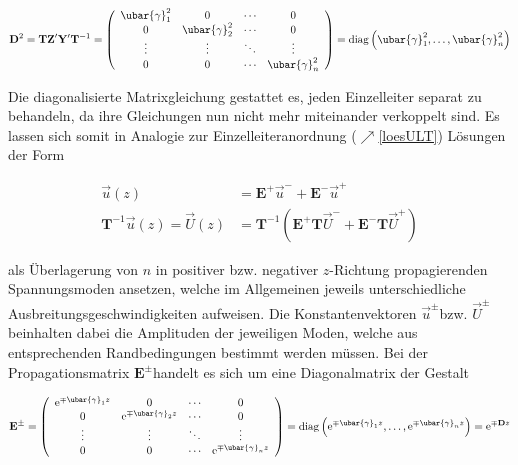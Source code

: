 \begin{equation}
	\mathbf{D}^{2}=\mathbf{T Z}^{\prime} \mathbf{Y}^{\prime} \mathbf{T}^{-1}=\left(\begin{array}{cccc}
		\ubar{\gamma}_{1}^{2} & 0 & \cdots & 0  \\
		0 & \ubar{\gamma}_{2}^{2} & \cdots & 0 \\
		\vdots & \vdots & \ddots & \vdots \\
		0 & 0 & \cdots & \ubar{\gamma}_{n}^{2}
	\end{array}\right)=\operatorname{diag}\left(\ubar{\gamma}_{1}^{2}, \ldots, \ubar{\gamma}_{n}^{2}\right)
\end{equation}

Die diagonalisierte Matrixgleichung gestattet es, jeden Einzelleiter separat zu behandeln, da ihre Gleichungen nun nicht mehr miteinander verkoppelt sind. Es lassen sich somit in Analogie zur Einzelleiteranordnung ($\nearrow$\ref{loesULT}) Lösungen der Form


\begin{align}
	\vec{u}(z) & =\mathbf{E}^{+} \vec{u}^{-}+\mathbf{E}^{-} \vec{u}^{+} \label{LTloesform} \\
	\mathbf{T}^{-1} \vec{u}(z)=\vec{U}(z) & =\mathbf{T}^{-1}\left(\mathbf{E}^{+} \mathbf{T} \vec{U}^{-}+\mathbf{E}^{-} \mathbf{T} \vec{U}^{+}\right) 
\end{align}


als Überlagerung von $n$ in positiver bzw. negativer $z$-Richtung propagierenden Spannungsmoden ansetzen, welche im Allgemeinen jeweils unterschiedliche Ausbreitungsgeschwindigkeiten aufweisen. Die Konstantenvektoren $\vec{u}^{ \pm}$bzw. $\vec{U}^{ \pm}$beinhalten dabei die Amplituden der jeweiligen Moden, welche aus entsprechenden Randbedingungen bestimmt werden müssen. Bei der Propagationsmatrix $\mathbf{E}^{ \pm}$handelt es sich um eine Diagonalmatrix der Gestalt

\begin{equation}
	\mathbf{E}^{ \pm}=\left(\begin{array}{cccc}
		\mathrm{e}^{\mp \ubar{\gamma}_{1} z} & 0 & \cdots & 0  \\
		0 & \mathrm{e}^{\mp \ubar{\gamma}_{2} z} & \cdots & 0 \\
		\vdots & \vdots & \ddots & \vdots \\
		0 & 0 & \cdots & \mathrm{e}^{\mp \ubar{\gamma}_{n} z}
	\end{array}\right)=\operatorname{diag}\left(\mathrm{e}^{\mp \ubar{\gamma}_{1} z}, \ldots, \mathrm{e}^{\mp \ubar{\gamma}_{n} z}\right)=\mathrm{e}^{\mp \mathbf{D} z}
\end{equation}

